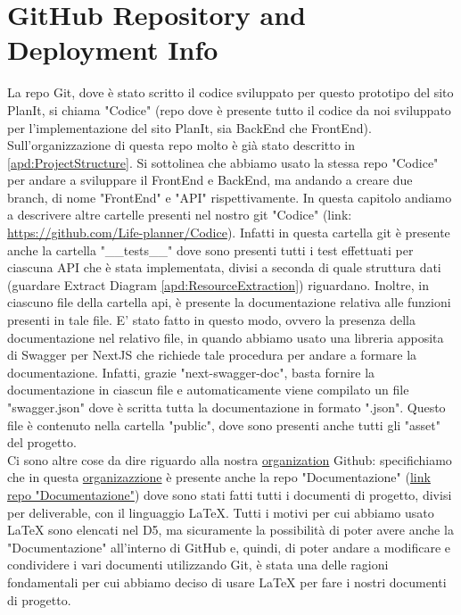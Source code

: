 \section{GitHub Repository and Deployment Info}
\label{secD4:GitHubRepositoryAndDeploymentInfo}
La repo Git, dove è stato scritto il codice sviluppato per questo prototipo del sito PlanIt, si chiama "Codice" (repo dove è presente tutto il codice da noi sviluppato per l'implementazione del sito PlanIt, sia BackEnd che FrontEnd). Sull'organizzazione di questa repo molto è già stato descritto in \ref{apd:ProjectStructure}. Si sottolinea che abbiamo usato la stessa repo "Codice" per andare a sviluppare il FrontEnd e BackEnd, ma andando a creare due branch, di nome "FrontEnd" e "API" rispettivamente. In questa capitolo andiamo a descrivere altre cartelle presenti nel nostro git "Codice" (link: \url{https://github.com/Life-planner/Codice}). Infatti in questa cartella git è presente anche la cartella "\_\_tests\_\_" dove sono presenti tutti i test effettuati per ciascuna API che è stata implementata, divisi a seconda di quale struttura dati (guardare Extract Diagram \ref{apd:ResourceExtraction}) riguardano. Inoltre, in  ciascuno file della cartella api, è presente la documentazione relativa alle funzioni presenti in tale file. E' stato fatto in questo modo, ovvero la presenza della documentazione nel relativo file, in quando abbiamo usato una libreria apposita di Swagger per NextJS che richiede tale procedura per andare a formare la documentazione. Infatti, grazie "next-swagger-doc", basta fornire la documentazione in ciascun file e automaticamente viene compilato un file "swagger.json" dove è scritta tutta la documentazione in formato ".json". Questo file è contenuto nella cartella "public", dove sono presenti anche tutti gli "asset" del progetto.\\
Ci sono altre cose da dire riguardo alla nostra \href{https://github.com/orgs/Life-planner/repositories}{organization} Github: specifichiamo che in questa \href{https://github.com/orgs/Life-planner/repositories}{organizazzione} è presente anche la repo "Documentazione" (\href{https://github.com/Life-planner/Documentazione}{link repo "Documentazione"}) dove sono stati fatti tutti i documenti di progetto, divisi per deliverable, con il linguaggio LaTeX. Tutti i motivi per cui abbiamo usato LaTeX sono elencati nel D5, ma sicuramente la possibilità di poter avere anche la "Documentazione" all'interno di GitHub e, quindi, di poter andare a modificare e condividere i vari documenti utilizzando Git, è stata una delle ragioni fondamentali per cui abbiamo deciso di usare LaTeX per fare i nostri documenti di progetto. \\
